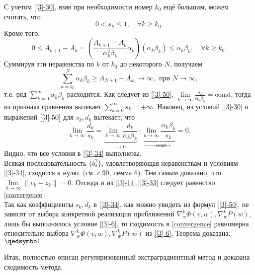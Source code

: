 С учетом \eqref{[3]-30}, взяв при необходимости номер $k_0$ ещё большим, можем считать, что 
\begin{equation*}
0<s_k\leqslant 1,\quad \forall k\geqslant k_0.
\end{equation*} 
Кроме того, 
\begin{equation*}
0\leqslant A_{k+1}-A_k=\left(\frac{A_{k+1}-A_k}{\alpha_k^2\beta_k}\alpha_k \right)(\alpha_k\beta_k)\leqslant \alpha_k\beta_k,\quad \forall k\geqslant k_0.
\end{equation*}
Суммируя эти неравенства по $k$ от $k_0$ до некоторого $N$, получаем 
\begin{equation*}
\sum_{k=k_0}^{N}\alpha_k\beta_k\geqslant A_{N+1}-A_{k_0}\to \infty, \text{ при } N\to \infty,
\end{equation*}
т.е. ряд $\sum\limits_{k=0}^{\infty}\alpha_k\beta_k$ расходится. Как следует из \eqref{[3]-50}, $\lim\limits_{k\to \infty} \frac{s_k}{\alpha_k\beta_k}=\text{const}$, тогда из признака сравнения вытекает $\sum\limits_{k=0}^{\infty}s_k=+\infty$. Наконец, из условий \eqref{[3]-30} и выражений $\eqref{[3]-50}$ для $s_k,d_k$ вытекает, что 
\begin{equation*}
\lim\limits_{k\to\infty}\frac{d_k}{s_k}=\underbrace{\lim\limits_{k\to\infty}\frac{d_k}{\alpha_k\beta_k}}_{\to 0}\cdot\underbrace{\lim\limits_{k\to\infty}\frac{\alpha_k\beta_k}{s_k}}_{\to \text{const}}=0.
\end{equation*}
Видно, что все условия в \eqref{[3]-34} выполнены.\\
Всякая последовательность $\{b_k^2\}$, удовлетворяющая неравенствам и условиям \eqref{[3]-34}, сходится к нулю. (см. \cite{5} c.90, лемма 6). Тем самым доказано, что $\lim\limits_{k\to \infty}\|v_k-z_k\|=0$. Отсюда и из \eqref{[3]-14},\eqref{[3]-33} следует равенство \eqref{convergence}.\\
Так как коэффициенты $s_k,d_k$ в \eqref{[3]-34}, как можно увидеть из формул \eqref{[3]-50}, не зависят от выбора конкретной реализации приближений $\nabla_w^k\Phi(v,w),\nabla_w^kP(w)$, лишь бы выполнялось условие \eqref{[3]-6}, то сходимость в \eqref{convergence} равномерна относительно выбора $\nabla_w^k\Phi(v,w),\nabla_w^kP(w)$ из \eqref{[3]-6}. Теорема доказана. $\qedsymbol$

Итак, полностью описан регуляризованный экстраградиентный метод и доказана сходимость метода.
\clearpage

